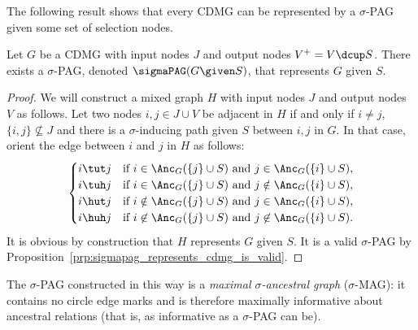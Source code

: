 The following result shows that every CDMG can be represented by a $\sigma$-PAG given some set of selection nodes.
\begin{Prp}\label{prp:from_cdmg_to_sigmapag}
  Let $G$ be a CDMG with input nodes $J$ and output nodes $V^+ = V \dcup S$. 
  There exists a $\sigma$-PAG, denoted $\sigmaPAG(G \given S)$, that represents $G$ given $S$.
\end{Prp}
\begin{proof}
  We will construct a mixed graph $H$ with input nodes $J$ and output nodes $V$ as follows.
  Let two nodes $i,j \in J\cup V$ be adjacent in $H$ if and only if $i \ne j$, $\{i,j\} \not\subseteq J$ and there is a $\sigma$-inducing path given $S$ between $i,j$ in $G$.
  In that case, orient the edge between $i$ and $j$ in $H$ as follows:
    $$\begin{cases}
      \text{$i \tut j$} & \text{if $i \in \Anc_G(\{j\} \cup S)$ and $j \in \Anc_G(\{i\} \cup S)$}, \\
      \text{$i \tuh  j$} & \text{if $i \in \Anc_G(\{j\} \cup S)$ and $j \notin \Anc_G(\{i\} \cup S)$}, \\
      \text{$i \hut  j$} & \text{if $i \notin \Anc_G(\{j\} \cup S)$ and $j \in \Anc_G(\{i\} \cup S)$}, \\
      \text{$i \huh j$} & \text{if $i \not\in \Anc_G(\{j\} \cup S)$ and $j \not\in \Anc_G(\{i\} \cup S)$.}
    \end{cases}$$
  It is obvious by construction that $H$ represents $G$ given $S$.
  It is a valid $\sigma$-PAG by Proposition~\ref{prp:sigmapag_represents_cdmg_is_valid}.
\end{proof}
The $\sigma$-PAG constructed in this way is a \emph{maximal $\sigma$-ancestral graph} ($\sigma$-MAG): it contains no circle edge marks and is therefore maximally informative about ancestral relations (that is, as informative as a $\sigma$-PAG can be).

